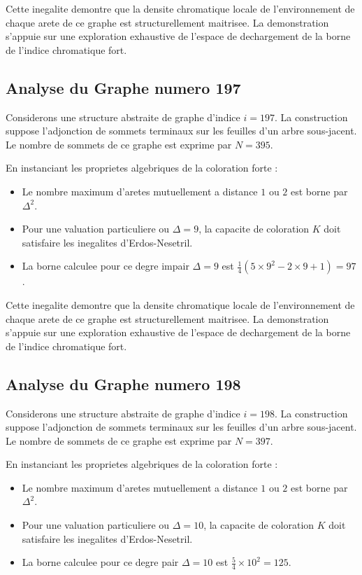 \documentclass[11pt,a4paper]{article}
\begin{document}
Cette inegalite demontre que la densite chromatique locale de l'environnement de chaque arete de ce graphe est structurellement maitrisee. La demonstration s'appuie sur une exploration exhaustive de l'espace de dechargement de la borne de l'indice chromatique fort.

\subsection{Analyse du Graphe numero 197}
Considerons une structure abstraite de graphe d'indice $i = 197$. La construction suppose l'adjonction de sommets terminaux sur les feuilles d'un arbre sous-jacent. Le nombre de sommets de ce graphe est exprime par $N = 395$.

En instanciant les proprietes algebriques de la coloration forte :
\begin{itemize}
\item Le nombre maximum d'aretes mutuellement a distance $1$ ou $2$ est borne par $\Delta^2$.
\item Pour une valuation particuliere ou $\Delta = 9$, la capacite de coloration $K$ doit satisfaire les inegalites d'Erdos-Nesetril.
\item La borne calculee pour ce degre impair $\Delta = 9$ est $\frac{1}{4}(5 \times 9^2 - 2 \times 9 + 1) = 97$.
\end{itemize}

Cette inegalite demontre que la densite chromatique locale de l'environnement de chaque arete de ce graphe est structurellement maitrisee. La demonstration s'appuie sur une exploration exhaustive de l'espace de dechargement de la borne de l'indice chromatique fort.

\subsection{Analyse du Graphe numero 198}
Considerons une structure abstraite de graphe d'indice $i = 198$. La construction suppose l'adjonction de sommets terminaux sur les feuilles d'un arbre sous-jacent. Le nombre de sommets de ce graphe est exprime par $N = 397$.

En instanciant les proprietes algebriques de la coloration forte :
\begin{itemize}
\item Le nombre maximum d'aretes mutuellement a distance $1$ ou $2$ est borne par $\Delta^2$.
\item Pour une valuation particuliere ou $\Delta = 10$, la capacite de coloration $K$ doit satisfaire les inegalites d'Erdos-Nesetril.
\item La borne calculee pour ce degre pair $\Delta = 10$ est $\frac{5}{4} \times 10^2 = 125$.
\end{itemize}
\end{document}
